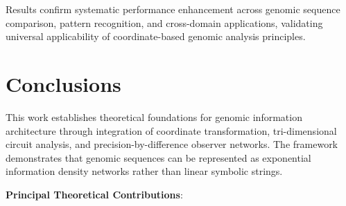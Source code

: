 \documentclass[12pt,a4paper]{article}
\begin{document}
\begin{table}[H]
Results confirm systematic performance enhancement across genomic sequence comparison, pattern recognition, and cross-domain applications, validating universal applicability of coordinate-based genomic analysis principles.

\section{Conclusions}

This work establishes theoretical foundations for genomic information architecture through integration of coordinate transformation, tri-dimensional circuit analysis, and precision-by-difference observer networks. The framework demonstrates that genomic sequences can be represented as exponential information density networks rather than linear symbolic strings.

\textbf{Principal Theoretical Contributions}:


\end{table}
\end{document}
